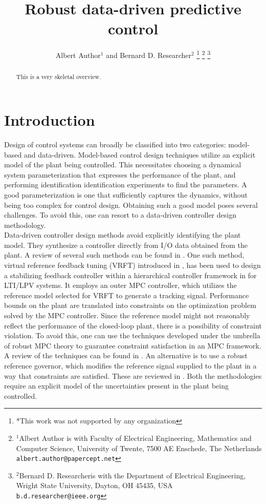 \documentclass[letterpaper, 10 pt, conference]{ieeeconf}  %
\title{\LARGE \bf
Robust data-driven predictive control
}
\author{Albert Author$^{1}$ and Bernard D. Researcher$^{2}$%
\thanks{*This work was not supported by any organization}%
\thanks{$^{1}$Albert Author is with Faculty of Electrical Engineering, Mathematics and Computer Science,
        University of Twente, 7500 AE Enschede, The Netherlands
        {\tt\small albert.author@papercept.net}}%
\thanks{$^{2}$Bernard D. Researcheris with the Department of Electrical Engineering, Wright State University,
        Dayton, OH 45435, USA
        {\tt\small b.d.researcher@ieee.org}}%
}
\begin{document}
\maketitle
\thispagestyle{empty}
\pagestyle{empty}


\begin{abstract}

This is a very skeletal overview.

\end{abstract}


\section{Introduction}
Design of control systems can broadly be classified into two categories: model-based and data-driven. Model-based control design techniques utilize an explicit model of the plant being controlled. This necessitates choosing a dynamical system parameterization that  expresses the performance of the plant, and performing identification identification experiments to find the parameters. A good parameterization is one that sufficiently captures the dynamics, without being too complex for control design. Obtaining such a good model poses several challenges. To avoid this, one can resort to a data-driven controller design methodology. \\
\indent
Data-driven controller design methods avoid explicitly identifying the plant model. They synthesize a controller directly from I/O data obtained from the plant. A review of several such methods can be found in \cite{HOU20133}. One such method, virtual reference feedback tuning (VRFT) introduced in \cite{CAMPI20021337}, has been used to design a stabilizing feedback controller within a hierarchical controller framework in \cite{7932940} for LTI/LPV systems. It employs an outer MPC controller, which utilizes the reference model selected for VRFT to generate a tracking signal. Performance bounds on the plant are translated into constraints on the optimization problem solved by the MPC controller. Since the reference model might not reasonably reflect the performance of the closed-loop plant, there is a possibility of constraint violation.
To avoid this, one can use the techniques developed under the umbrella of robust MPC theory to guarantee constraint satisfaction in an MPC framework. A review of the techniques can be found in \cite{10.1007/BFb0109870}. An alternative is to use a robust reference governor, which modifies the reference signal supplied to the plant in a way that constraints are satisfied. These are reviewed in \cite{GARONE2017306}. Both the methodologies require an explicit model of the uncertainties present in the plant being controlled. 
\end{document}
